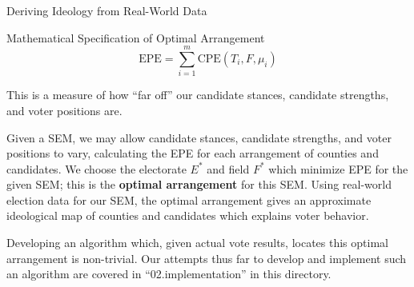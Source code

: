\documentclass{article}
\newcommand{\noi}{\noindent}
\begin{document}
\begin{section}{Deriving Ideology from Real-World Data}
\begin{subsection}{Mathematical Specification of Optimal Arrangement}
$$\text{EPE} = \sum_{i=1}^m \text{CPE}(T_i, F, \mu_i)$$

\noi This is a measure of how ``far off'' our candidate stances, candidate strengths, and voter positions are.

Given a SEM, we may allow candidate stances, candidate strengths, and voter positions to vary, calculating the EPE for each arrangement of counties and candidates. We choose the electorate $E^*$ and field $F^*$ which minimize EPE for the given SEM; this is the \textbf{optimal arrangement} for this SEM. Using real-world election data for our SEM, the optimal arrangement gives an approximate ideological map of counties and candidates which explains voter behavior.

Developing an algorithm which, given actual vote results, locates this optimal arrangement is non-trivial. Our attempts thus far to develop and implement such an algorithm are covered in ``02.implementation'' in this directory.

\end{subsection}

\end{section}
\end{document}

